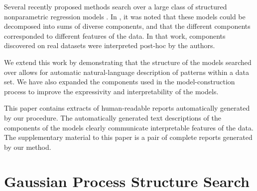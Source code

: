 \documentclass{article} %
\def\ie{i.e.\ }
\begin{document}
Several recently proposed methods search over a large class of structured nonparametric regression models \citep{DuvLloGroetal13, kronberger2013evolution, diosan2007evolving, bing2010gp}.  In \citep{DuvLloGroetal13}, it was noted that these models could be decomposed into sums of diverse components,  %
and that the different components corresponded to different features of the data.  In that work, components discovered on real datasets were interpreted post-hoc by the authors.

We extend this work by demonstrating that the structure of the models searched over allows for automatic natural-language description of patterns within a data set.
We have also expanded the components used in the model-construction process to improve the expressivity and interpretability of the models.

This paper contains extracts of human-readable reports automatically generated by our procedure.
The automatically generated text descriptions of the components of the models clearly communicate interpretable features of the data.
The supplementary material to this paper is a pair of complete reports generated by our method.



\section{Gaussian Process Structure Search}
\label{sec:gpss}
\vspace{-0.08in}
\end{document}
